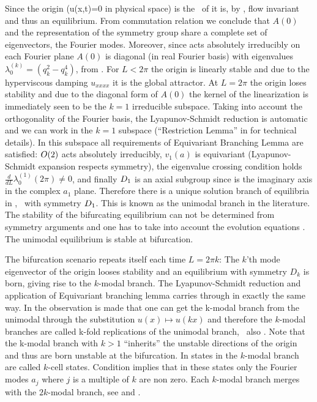  Since the origin (u(x,t)=0 in physical space) is the \fixedsp\ of  it is, 
by , flow invariant and thus
an equilibrium. From commutation relation  we conclude that $A(0)$
and the representation of the symmetry group  share a complete
set of eigenvectors, the Fourier modes. Moreover, since  acts absolutely irreducibly
on each Fourier plane $A(0)$ is diagonal (in real Fourier basis)
with eigenvalues $\lambda_0^{(k)}=( q_k^2 - q_k^4 )$, from .
For $L<2\pi$
the origin is linearly stable and due to the hyperviscous damping $u_{xxxx}$ it is the global
attractor. At $L=2\pi$ the origin loses stability and due
to the diagonal form of $A(0)$ the kernel of the linearization is immediately seen to be the
$k=1$ irreducible subspace. Taking into account the orthogonality of the Fourier basis, the Lyapunov-Schmidt reduction is automatic and we can work in the $k=1$ subspace (\cf ``Restriction Lemma'' in 
for technical details). In this subspace all requirements
of Equivariant Branching Lemma are satisfied: $O(2)$ acts
absolutely irreducibly, $v_1(a)$ is equivariant (Lyapunov-Schmidt expansion respects symmetry),
the eigenvalue crossing condition holds $\frac{d}{d L}\lambda_0^{(1)}(2\pi)\neq 0$, and
finally $D_{1}$ is an axial subgroup since  is the imaginary axis in the complex $a_1$ plane.
Therefore there is a unique solution branch of equilibria in , \ie\ with symmetry $D_{1}$.
This is known as the unimodal branch in the literature. The stability of the bifurcating equilibrium
can not be determined from symmetry arguments and one has to take into account the evolution equations
. The unimodal equilibrium is stable at bifurcation.

The bifurcation scenario repeats itself each time $L=2\pi k$: The $k$'th mode eigenvector of
the origin looses stability and an equilibrium with symmetry $D_k$ is born, giving rise to
the $k$-modal branch. The Lyapunov-Schmidt reduction and application of Equivariant branching lemma
carries through in exactly the same way. In  the observation is made that one
can get the k-modal branch from the unimodal through the substitution $u(x)\mapsto u(kx)$
and therefore the $k$-modal branches are called k-fold replications
of the unimodal branch, \cf\ also . Note that the k-modal branch
with $k>1$ ``inherits'' the unstable directions of the origin and thus are born unstable at the
bifurcation. In  states in the $k$-modal branch are called $k$-cell states.
Condition  implies that in these states only the Fourier modes $a_j$ where $j$
is a multiple of $k$ are non zero. Each $k$-modal branch merges with the $2k$-modal branch, see 
and .

